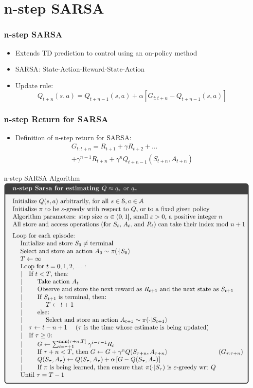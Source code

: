 \documentclass{beamer}
\begin{document}
    \section{n-step SARSA}
    \begin{frame}
        \frametitle{n-step SARSA}
        \begin{itemize}
            \item Extends TD prediction to control using an on-policy method
            \item SARSA: State-Action-Reward-State-Action
            \item Update rule:
            $$
            Q_{t+n}(s,a) = Q_{t+n-1}(s,a) + \alpha \left[G_{t:t+n} - Q_{t+n-1}(s,a)\right]
            $$
        \end{itemize}
    \end{frame}


    \begin{frame}
        \frametitle{n-step Return for SARSA}
        \begin{itemize}
            \item Definition of n-step return for SARSA:
            \begin{multline*}
                G_{t:t+n} = R_{t+1} + \gamma R_{t+2} + \ldots \\
                + \gamma^{n-1} R_{t+n} + \gamma^n Q_{t+n-1}(S_{t+n}, A_{t+n})
            \end{multline*}
        \end{itemize}
    \end{frame}

    \begin{frame}{n-step SARSA Algorithm}
        \includegraphics[width=\textwidth]{public/n-step-sarsa-alg}
    \end{frame}
\end{document}
